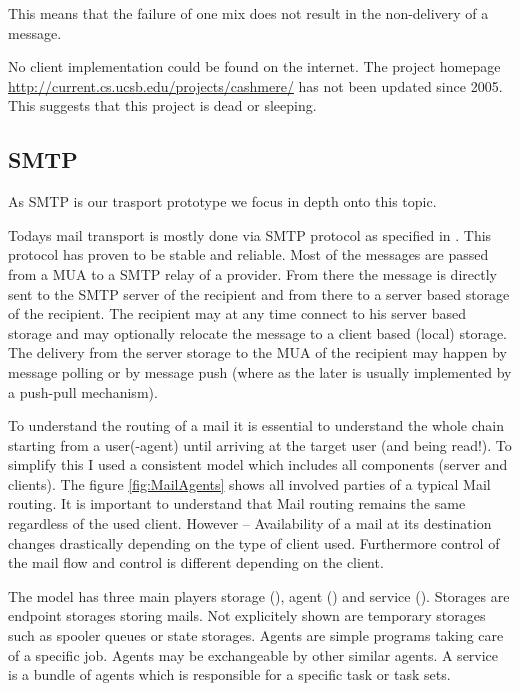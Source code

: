This means that the failure of one mix does not result in the non-delivery of a message.

No client implementation could be found on the internet. The project homepage \href{http://current.cs.ucsb.edu/projects/cashmere/}{http://current.cs.ucsb.edu/projects/cashmere/} has not been updated since 2005. This suggests that this project is dead or sleeping.

\subsection{SMTP\label{sec:mailTransport}}
As SMTP is our trasport prototype we focus in depth onto this topic.

Todays mail transport is mostly done via SMTP protocol as specified in \cite{RFC5321}. This protocol has proven to be stable and reliable. Most of the messages are passed from a MUA to a SMTP relay of a provider. From there the message is directly sent to the SMTP server of the recipient and from there to a server based storage of the recipient. The recipient may at any time connect to his server based storage and may optionally relocate the message to a client based (local) storage. The delivery from the server storage to the MUA of the recipient may happen by message polling or by message push (where as the later is usually implemented by a push-pull mechanism).\par

To understand the routing of a mail it is essential to understand the whole chain starting from a user(-agent) until arriving at the target user (and being read!). To simplify this I used a consistent model which includes all components (server and clients). The figure \ref{fig:MailAgents} shows all involved parties of a typical Mail routing. It is important to understand that Mail routing remains the same regardless of the used client. However -- Availability of a mail at its destination changes drastically depending on the type of client used. Furthermore control of the mail flow and control is different depending on the client.\par

The model has three main players storage (), agent () and service (). Storages are endpoint storages storing mails. Not explicitely shown are temporary storages such as spooler queues or state storages. Agents are simple programs taking care of a specific job. Agents may be exchangeable by other similar agents. A service is a bundle of agents which is responsible for a specific task or task sets.

